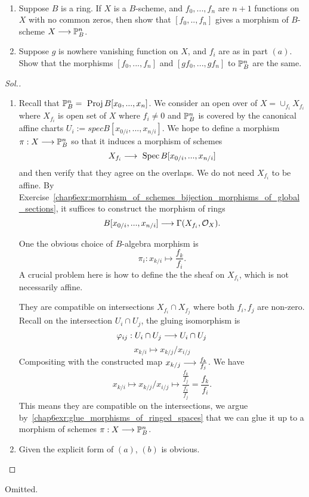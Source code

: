 \documentclass[11pt]{book} %
\begin{document}
\begin{exr}
\ \begin{enumerate}[label=(\alph*)]
\item Suppose $B$ is a ring. If $X$ is a $B$-scheme, and $f_0,...,f_n$ are $n+1$ functions on $X$ with no common zeros, then show that $[f_0,..,f_n]$ gives a morphism of $B$-scheme $X\longrightarrow \mathbb P^n_B$.
\item Suppose $g$ is nowhere vanishing function on $X$, and $f_i$ are as in part $(a)$. Show that the morphisms $[f_0,...,f_n]$ and $[gf_0,...,g f_n]$ to $\mathbb P^n_B$ are the same.
\end{enumerate}
\end{exr}
\begin{proof}[Sol.]
\ \begin{enumerate}[label=(\alph*)]
\item Recall that $\mathbb P_B^n=\text{ Proj\,} B[x_0,...,x_n]$. We consider an open over of $X=\cup_{f_i} X_{f_i}$ where $X_{f_i}$ is open set of $X$ where $f_i\neq 0$ and $\mathbb P^n_B$ is covered by the canonical affine charts $U_i:=spec B[x_{0/i},...,x_{n/i}]$. We hope to define a morphism $\pi:X\longrightarrow\mathbb P^n_B$ so that it induces a morphism of schemes
$$
X_{f_i}\longrightarrow \text{ Spec\,} B[x_{0/i},...,x_{n/i}]
$$
and then verify that they agree on the overlaps.
 We do not need $X_{f_i}$ to be affine. By Exercise~\ref{chap6exr:morphism_of_schemes_bijection_morphisms_of_global_sections}, it suffices to construct the morphism of rings
$$
B[x_{0/i},...,x_{n/i}]\longrightarrow \Gamma(X_{f_i},{\cal O}_{X}).
$$

One the obvious choice of $B$-algebra morphism is
$$
\pi_i:x_{k/i}\longmapsto \frac{f_k}{f_i}.
$$
{\color{red} A crucial problem here is how to define the the sheaf on $X_{f_i}$, which is not necessarily affine.}

They are compatible on intersections $X_{f_i}\cap X_{f_j}$ where both $f_i,f_j$ are non-zero. Recall on the intersection $U_i\cap U_j$, the gluing isomorphism is 
$$
\varphi_{ij}: U_i\cap U_j\longrightarrow U_i\cap U_j
$$
$$
x_{k/i}\longmapsto x_{k/j}/x_{i/j}
$$
Compositing with the constructed map $x_{k/j}\longrightarrow \frac{f_k}{f_j}$.
We
have
$$
x_{k/i}\longmapsto x_{k/j}/x_{i/j}\longmapsto \frac{\frac{f_k}{f_j}}{\frac{f_i}{f_j}}=\frac{f_k}{f_i}.
$$
This means they are compatible on the intersections, we argue by~\ref{chap6exr:glue_morphisms_of_ringed_spaces} that we can glue it up to a morphism of schemes $\pi:X\longrightarrow\mathbb P^n_B$.

\item Given the explicit form of $(a)$, $(b)$ is obvious.
\end{enumerate}
\end{proof}
\begin{exr}
Omitted.
\end{exr}
\end{document}
